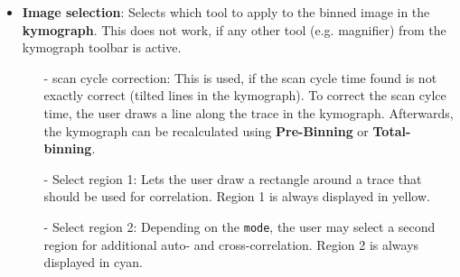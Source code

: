 \begin{itemize}
\item  \textbf{Image selection}: Selects which tool to apply to the binned image in the \textbf{kymograph}. This does not work, if any other tool (e.g. magnifier) from the kymograph toolbar is active.
	\begin{itemize}
	\item[-] scan cycle correction: This is used, if the scan cycle time found is not exactly correct (tilted lines in the kymograph). To correct the scan cylce time, the user draws a line along the trace in the kymograph. Afterwards, the kymograph can be recalculated using \textbf{Pre-Binning} or \textbf{Total-binning}.
	\item[-] Select region 1: Lets the user draw a rectangle around a trace that should be used for correlation. Region 1 is always displayed in yellow.
	\item[-] Select region 2: Depending on the \texttt{mode}, the user may select a second region for additional auto- and cross-correlation. Region 2 is always displayed in cyan.
	\end{itemize}
	

\end{itemize}
